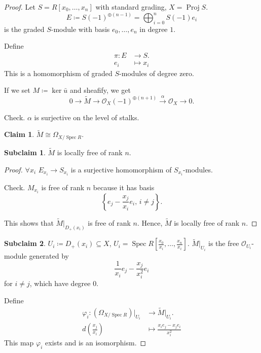 \documentclass[12pt]{article}
\DeclareMathOperator{\Spec}{Spec}
\DeclareMathOperator{\Proj}{Proj}
\theoremstyle{definition}
\newtheorem*{claim}{Claim}
\newtheorem{subclaim}{Subclaim}
\begin{document}
\begin{proof}
Let $S=R[x_0,\ldots,x_n]$ with standard grading, $X=\Proj S$.
\[E\coloneqq S(-1)^{\oplus(n-1)}=\bigoplus_{i=0}^nS(-1)e_i\]
is the graded $S$-module with basis $e_0,\ldots,e_n$ in degree $1$.

Define
\begin{align*}
\pi:E&\longrightarrow S.\\
e_i&\longmapsto x_i
\end{align*}
This is a homomorphism of graded $S$-modules of degree zero.

If we set $M\coloneqq\ker\bar{u}$ and sheafify, we get
\[0\longrightarrow\widetilde{M}\longrightarrow\mathcal{O}_X(-1)^{\oplus(n+1)}\overset{\alpha}{\longrightarrow}\mathcal{O}_X\longrightarrow0.\]

Check. $\alpha$ is surjective on the level of stalks.

\begin{claim}
$\widetilde{M}\cong\Omega_{X/\Spec R}$.
\end{claim}

\begin{subclaim}
$\widetilde{M}$ is locally free of rank $n$.
\end{subclaim}

\begin{proof}
$\forall x_i$ $E_{x_i}\rightarrow S_{x_i}$ is a surjective homomorphism of $S_{x_i}$-modules.

Check. $M_{x_i}$ is free of rank $n$ because it has basis
\[\left\{e_j-\frac{x_j}{x_i}e_i,\,i\neq j\right\}.\]

This shows that $\widetilde{M}|_{D_+(x_i)}$ is free of rank $n$. Hence, $\widetilde{M}$ is locally free of rank $n$.
\end{proof}

\begin{subclaim}
$U_i\coloneqq D_+(x_i)\subseteq X$, $U_i=\Spec R[\frac{x_0}{x_i},\ldots,\frac{x_n}{x_i}]$. $\widetilde{M}|_{U_i}$ is the free $\mathcal{O}_{U_i}$-module generated by
\[\frac{1}{x_i}e_j-\frac{x_j}{x_i^2}e_i\]
for $i\neq j$, which have degree 0.
\end{subclaim}

Define
\begin{align*}
\varphi_i:(\Omega_{X/\Spec R})|_{U_i}&\longrightarrow\widetilde{M}|_{U_i}.\\
d\left(\frac{x_j}{x_i}\right)&\longmapsto\frac{x_ie_j-x_je_i}{x_i^2}
\end{align*}
This map $\varphi_i$ exists and is an isomorphism.


\end{proof}
\end{document}
